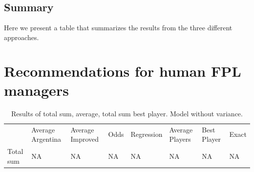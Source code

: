 \subsection{Summary}
Here we present a table that summarizes the results from the three different approaches. 



\section{Recommendations for human FPL managers}

\begin{table}[H]
\centering
\caption{Results of total sum, average, total sum best player. Model without variance.}
\begin{tabular}{llllllll}
& Average Argentina & Average Improved & Odds & Regression  & Average Players & Best Player & Exact\\
Total sum  & NA  & NA & NA & NA & NA & NA & NA \\
\end{tabular}
\end{table}

